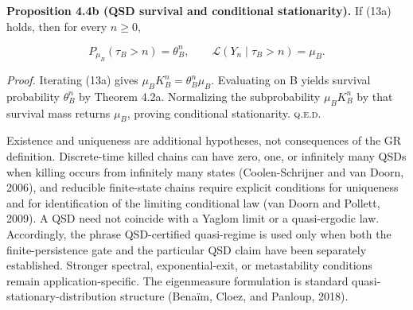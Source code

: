 \documentclass[10pt]{article}
\begin{document}
\textbf{Proposition 4.4b (QSD survival and conditional stationarity).} If (13a) holds, then for every \(n\ge0\),

\begin{equation}
P_{\mu_B}(\tau_B>n)=\theta_B^n,\qquad \mathcal L(Y_n\mid\tau_B>n)=\mu_B.
\tag{13b}\label{eq:13b}
\end{equation}

\emph{Proof.} Iterating (13a) gives \(\mu_BK_B^n=\theta_B^n\mu_B\). Evaluating on B yields survival probability \(\theta_B^n\) by Theorem 4.2a. Normalizing the subprobability \(\mu_BK_B^n\) by that survival mass returns \(\mu_B\), proving conditional stationarity. \hfill\textsc{q.e.d.}

Existence and uniqueness are additional hypotheses, not consequences of the GR definition. Discrete-time killed chains can have zero, one, or infinitely many QSDs when killing occurs from infinitely many states (Coolen-Schrijner and van Doorn, 2006), and reducible finite-state chains require explicit conditions for uniqueness and for identification of the limiting conditional law (van Doorn and Pollett, 2009). A QSD need not coincide with a Yaglom limit or a quasi-ergodic law. Accordingly, the phrase QSD-certified quasi-regime is used only when both the finite-persistence gate and the particular QSD claim have been separately established. Stronger spectral, exponential-exit, or metastability conditions remain application-specific. The eigenmeasure formulation is standard quasi-stationary-distribution structure (Bena\"im, Cloez, and Panloup, 2018).
\end{document}
